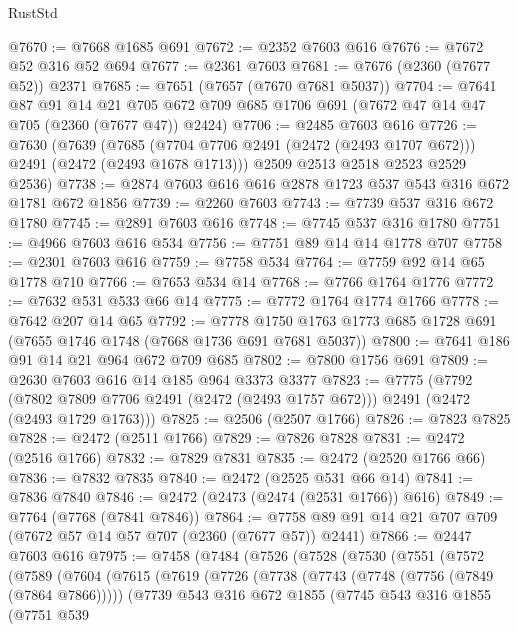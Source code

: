 \begin{lexlean}{RustStd}
\begin{coremodule}
@7670 := @7668 @1685 @691
@7672 := @2352 @7603 @616
@7676 := @7672 @52 @316 @52 @694
@7677 := @2361 @7603
@7681 := @7676 (@2360 (@7677 @52)) @2371
@7685 := @7651 (@7657 (@7670 @7681 @5037))
@7704 := @7641
    @87
    @91
    @14
    @21
    @705
    @672
    @709
    @685
    @1706
    @691
    (@7672 @47 @14 @47 @705 (@2360 (@7677 @47)) @2424)
@7706 := @2485 @7603 @616
@7726 := @7630
    (@7639
      (@7685 (@7704 @7706 @2491 (@2472 (@2493 @1707 @672))) @2491 (@2472 (@2493 @1678 @1713)))
      @2509
      @2513
      @2518
      @2523
      @2529
      @2536)
@7738 := @2874 @7603 @616 @616 @2878 @1723 @537 @543 @316 @672 @1781 @672 @1856
@7739 := @2260 @7603
@7743 := @7739 @537 @316 @672 @1780
@7745 := @2891 @7603 @616
@7748 := @7745 @537 @316 @1780
@7751 := @4966 @7603 @616 @534
@7756 := @7751 @89 @14 @14 @1778 @707
@7758 := @2301 @7603 @616
@7759 := @7758 @534
@7764 := @7759 @92 @14 @65 @1778 @710
@7766 := @7653 @534 @14
@7768 := @7766 @1764 @1776
@7772 := @7632 @531 @533 @66 @14
@7775 := @7772 @1764 @1774 @1766
@7778 := @7642 @207 @14 @65
@7792 := @7778 @1750 @1763 @1773 @685 @1728 @691 (@7655 @1746 @1748 (@7668 @1736 @691 @7681 @5037))
@7800 := @7641 @186 @91 @14 @21 @964 @672 @709 @685
@7802 := @7800 @1756 @691
@7809 := @2630 @7603 @616 @14 @185 @964 @3373 @3377
@7823 := @7775
    (@7792 (@7802 @7809 @7706 @2491 (@2472 (@2493 @1757 @672))) @2491 (@2472 (@2493 @1729 @1763)))
@7825 := @2506 (@2507 @1766)
@7826 := @7823 @7825
@7828 := @2472 (@2511 @1766)
@7829 := @7826 @7828
@7831 := @2472 (@2516 @1766)
@7832 := @7829 @7831
@7835 := @2472 (@2520 @1766 @66)
@7836 := @7832 @7835
@7840 := @2472 (@2525 @531 @66 @14)
@7841 := @7836 @7840
@7846 := @2472 (@2473 (@2474 (@2531 @1766)) @616)
@7849 := @7764 (@7768 (@7841 @7846))
@7864 := @7758 @89 @91 @14 @21 @707 @709 (@7672 @57 @14 @57 @707 (@2360 (@7677 @57)) @2441)
@7866 := @2447 @7603 @616
@7975 := @7458
    (@7484
      (@7526
        (@7528
          (@7530
            (@7551
              (@7572
                (@7589
                  (@7604
                    (@7615
                      (@7619
                        (@7726
                          (@7738
                            (@7743 (@7748 (@7756 (@7849 (@7864 @7866)))))
                            (@7739
                              @543
                              @316
                              @672
                              @1855
                              (@7745
                                @543
                                @316
                                @1855
                                (@7751
                                  @539

\end{coremodule}
\end{lexlean}

